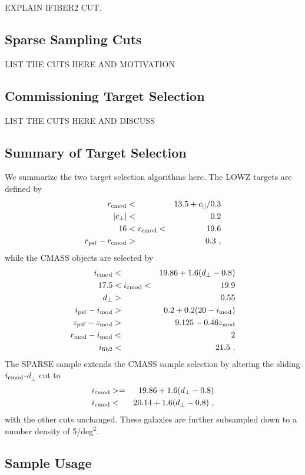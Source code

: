 \documentclass[preprint]{aastex}
\newcommand{\cpp}{c_{\perp}}
\newcommand{\cll}{c_{||}}
\newcommand{\dpp}{d_{\perp}}
\newcommand{\rmod}{r_{\rm mod}}
\newcommand{\imod}{i_{\rm mod}}
\newcommand{\rcmod}{r_{\rm cmod}}
\newcommand{\icmod}{i_{\rm cmod}}
\newcommand{\ipsf}{i_{\rm psf}}
\newcommand{\zpsf}{z_{\rm psf}}
\newcommand{\zmod}{z_{\rm mod}}
\newcommand{\rpsf}{r_{\rm psf}}
\newcommand{\ifib}{i_{\rm fib2}}
\begin{document}
EXPLAIN IFIBER2 CUT.

\subsection{Sparse Sampling Cuts}

LIST THE CUTS HERE AND MOTIVATION

\subsection{Commissioning Target Selection}

LIST THE CUTS HERE AND DISCUSS

\subsection{Summary of Target Selection}

We summarize the two target selection algorithms here. The LOWZ targets are
defined by 
\begin{eqnarray}
\rcmod  & < & 13.5 + \cll/0.3 \\ 
|\cpp| & < & 0.2 \\
16 & < \rcmod < & 19.6 \\
\rpsf - \rcmod & > & 0.3 \,\,,
\end{eqnarray}
while the CMASS objects are selected by 
\begin{eqnarray}
\icmod & < & 19.86 + 1.6(\dpp - 0.8) \\
17.5 & < \icmod <  & 19.9 \\
\dpp & > & 0.55 \\
\ipsf - \imod & > & 0.2 + 0.2(20 - \imod) \\
\zpsf - \zmod & > & 9.125 - 0.46 \zmod \\
\rmod - \imod & < & 2 \\
\ifib & < & 21.5 \,\,.
\end{eqnarray}
The SPARSE sample extends the CMASS sample selection by altering the sliding
$\icmod$-$\dpp$ cut to 
\begin{eqnarray}
\icmod & >= & 19.86 + 1.6(\dpp - 0.8) \\
\icmod & < & 20.14 + 1.6(\dpp - 0.8) \,\,, 
\end{eqnarray}
with the other cuts unchanged. These galaxies are further subsampled down to a
number density of 5/deg$^2$. 

\subsection{Sample Usage}
\end{document}
